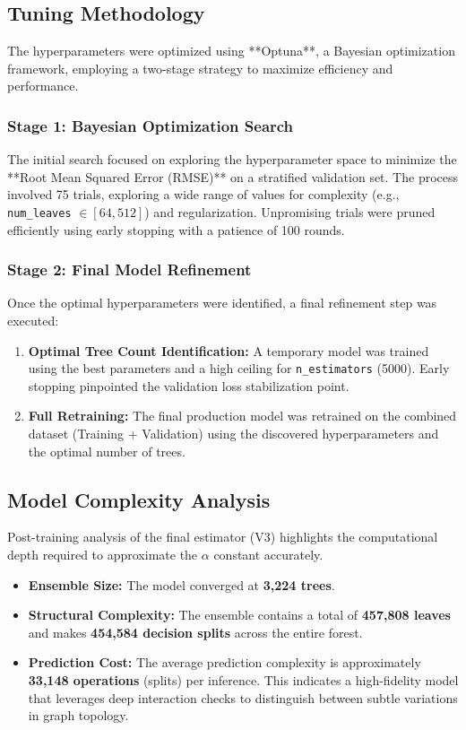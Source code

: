 \documentclass{article}
\begin{document}
\subsection{Tuning Methodology}

The hyperparameters were optimized using **Optuna**, a Bayesian optimization framework, employing a two-stage strategy to maximize efficiency and performance.

\subsubsection{Stage 1: Bayesian Optimization Search}
The initial search focused on exploring the hyperparameter space to minimize the **Root Mean Squared Error (RMSE)** on a stratified validation set. The process involved 75 trials, exploring a wide range of values for complexity (e.g., \texttt{num\_leaves} $\in [64, 512]$) and regularization. Unpromising trials were pruned efficiently using early stopping with a patience of 100 rounds.

\subsubsection{Stage 2: Final Model Refinement}
Once the optimal hyperparameters were identified, a final refinement step was executed:
\begin{enumerate}
    \item \textbf{Optimal Tree Count Identification:} A temporary model was trained using the best parameters and a high ceiling for \texttt{n\_estimators} (5000). Early stopping pinpointed the validation loss stabilization point.
    \item \textbf{Full Retraining:} The final production model was retrained on the combined dataset (Training + Validation) using the discovered hyperparameters and the optimal number of trees.
\end{enumerate}

\subsection{Model Complexity Analysis}

Post-training analysis of the final estimator (V3) highlights the computational depth required to approximate the $\alpha$ constant accurately. 

\begin{itemize}
    \item \textbf{Ensemble Size:} The model converged at \textbf{3,224 trees}.
    \item \textbf{Structural Complexity:} The ensemble contains a total of \textbf{457,808 leaves} and makes \textbf{454,584 decision splits} across the entire forest.
    \item \textbf{Prediction Cost:} The average prediction complexity is approximately \textbf{33,148 operations} (splits) per inference. This indicates a high-fidelity model that leverages deep interaction checks to distinguish between subtle variations in graph topology.
\end{itemize}
\end{document}
